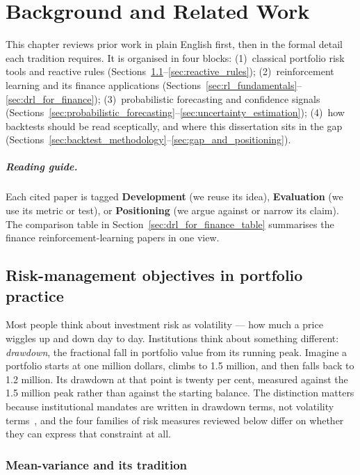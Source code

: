 \chapter{Background and Related Work}
\label{ch:background}

This chapter reviews prior work in plain English first, then in the formal detail each tradition requires. It is organised in four blocks: (1)~classical portfolio risk tools and reactive rules (Sections~\ref{sec:risk_measures}--\ref{sec:reactive_rules}); (2)~reinforcement learning and its finance applications (Sections~\ref{sec:rl_fundamentals}--\ref{sec:drl_for_finance}); (3)~probabilistic forecasting and confidence signals (Sections~\ref{sec:probabilistic_forecasting}--\ref{sec:uncertainty_estimation}); (4)~how backtests should be read sceptically, and where this dissertation sits in the gap (Sections~\ref{sec:backtest_methodology}--\ref{sec:gap_and_positioning}).

\paragraph{Reading guide.} Each cited paper is tagged \textbf{Development} (we reuse its idea), \textbf{Evaluation} (we use its metric or test), or \textbf{Positioning} (we argue against or narrow its claim). The comparison table in Section~\ref{sec:drl_for_finance_table} summarises the finance reinforcement-learning papers in one view.

\section{Risk-management objectives in portfolio practice}
\label{sec:risk_measures}

Most people think about investment risk as volatility --- how much a price wiggles up and down day to day. Institutions think about something different: \emph{drawdown}, the fractional fall in portfolio value from its running peak. Imagine a portfolio starts at one million dollars, climbs to 1.5 million, and then falls back to 1.2 million. Its drawdown at that point is twenty per cent, measured against the 1.5 million peak rather than against the starting balance. The distinction matters because institutional mandates are written in drawdown terms, not volatility terms~\parencite{calpers2022policy,dalio2017principles}, and the four families of risk measures reviewed below differ on whether they can express that constraint at all.

\subsection{Mean-variance and its tradition}
\label{sec:markowitz}

